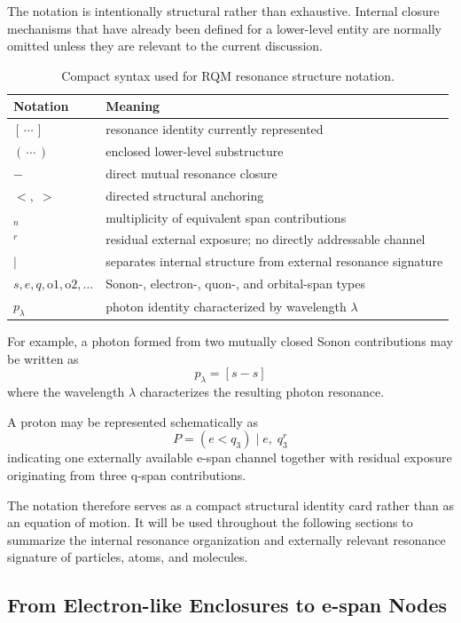 \documentclass[11pt,a4paper]{article}
\begin{document}
The notation is intentionally structural rather than exhaustive. Internal closure mechanisms that have already been defined for a lower-level entity are normally omitted unless they are relevant to the current discussion.

\begin{table}[h]
\centering
\begin{tabular}{ll}
\hline
\textbf{Notation} & \textbf{Meaning} \\
\hline
$[\,\cdots\,]$ & resonance identity currently represented \\
$(\,\cdots\,)$ & enclosed lower-level substructure \\
$-$ & direct mutual resonance closure \\
$<,\;>$ & directed structural anchoring \\
$_n$ & multiplicity of equivalent span contributions \\
$^{r}$ & residual external exposure; no directly addressable channel \\
$\big|$ & separates internal structure from external resonance signature \\
$s,e,q,\mathrm{o1},\mathrm{o2},\ldots$ & Sonon-, electron-, quon-, and orbital-span types \\
$p_{\lambda}$ & photon identity characterized by wavelength $\lambda$ \\
\hline
\end{tabular}
\caption{Compact syntax used for RQM resonance structure notation.}
\end{table}

For example, a photon formed from two mutually closed Sonon contributions may be written as
\[
\boxed{
p_{\lambda}=[s-s]
}
\]
where the wavelength \(\lambda\) characterizes the resulting photon resonance.

A proton may be represented schematically as
\[
\boxed{
P=(e<q_3)
\;\Big|\;
e,\;q_3^{r}
}
\]
indicating one externally available e-span channel together with residual exposure originating from three q-span contributions.

The notation therefore serves as a compact structural identity card rather than as an equation of motion. It will be used throughout the following sections to summarize the internal resonance organization and externally relevant resonance signature of particles, atoms, and molecules.




\subsection{From Electron-like Enclosures to e-span Nodes}
\end{document}
